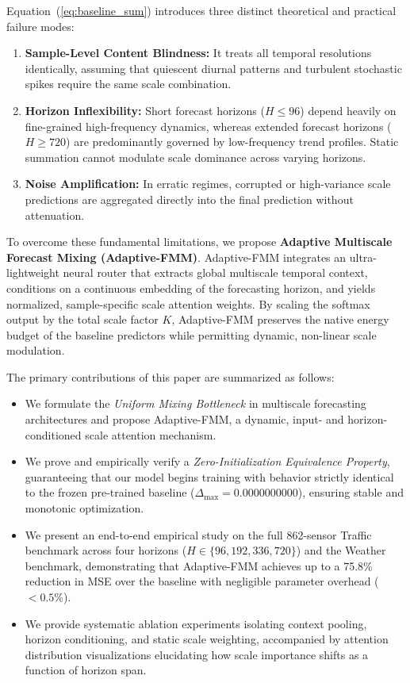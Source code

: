 \documentclass[journal]{IEEEtran}
\begin{document}
Equation~(\ref{eq:baseline_sum}) introduces three distinct theoretical and practical failure modes:
\begin{enumerate}
    \item \textbf{Sample-Level Content Blindness:} It treats all temporal resolutions identically, assuming that quiescent diurnal patterns and turbulent stochastic spikes require the same scale combination.
    \item \textbf{Horizon Inflexibility:} Short forecast horizons ($H \le 96$) depend heavily on fine-grained high-frequency dynamics, whereas extended forecast horizons ($H \ge 720$) are predominantly governed by low-frequency trend profiles. Static summation cannot modulate scale dominance across varying horizons.
    \item \textbf{Noise Amplification:} In erratic regimes, corrupted or high-variance scale predictions are aggregated directly into the final prediction without attenuation.
\end{enumerate}

To overcome these fundamental limitations, we propose \textbf{Adaptive Multiscale Forecast Mixing (Adaptive-FMM)}. Adaptive-FMM integrates an ultra-lightweight neural router that extracts global multiscale temporal context, conditions on a continuous embedding of the forecasting horizon, and yields normalized, sample-specific scale attention weights. By scaling the softmax output by the total scale factor $K$, Adaptive-FMM preserves the native energy budget of the baseline predictors while permitting dynamic, non-linear scale modulation.

The primary contributions of this paper are summarized as follows:
\begin{itemize}
    \item We formulate the \textit{Uniform Mixing Bottleneck} in multiscale forecasting architectures and propose Adaptive-FMM, a dynamic, input- and horizon-conditioned scale attention mechanism.
    \item We prove and empirically verify a \textit{Zero-Initialization Equivalence Property}, guaranteeing that our model begins training with behavior strictly identical to the frozen pre-trained baseline ($\Delta_{\max} = 0.0000000000$), ensuring stable and monotonic optimization.
    \item We present an end-to-end empirical study on the full 862-sensor Traffic benchmark across four horizons ($H \in \{96, 192, 336, 720\}$) and the Weather benchmark, demonstrating that Adaptive-FMM achieves up to a 75.8\% reduction in MSE over the baseline with negligible parameter overhead ($<0.5\%$).
    \item We provide systematic ablation experiments isolating context pooling, horizon conditioning, and static scale weighting, accompanied by attention distribution visualizations elucidating how scale importance shifts as a function of horizon span.
\end{itemize}
\end{document}
